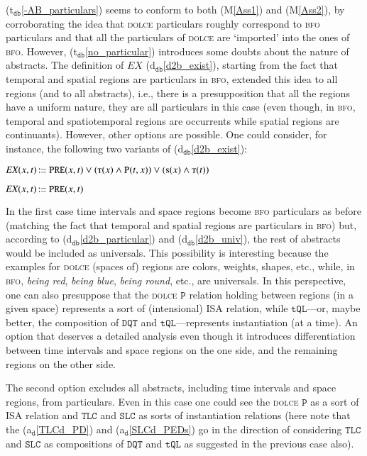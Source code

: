 \documentclass[ao]{iosart2x}
\newcommand{\nb}[1]{\textcolor{red}{$|$}\marginpar{\hspace*{-0cm}\parbox{20mm}{\scriptsize\raggedright\textcolor{red}{#1}}}}
\newcommand{\bflist}{\begin{list}{}{\setlength{\topsep}{2mm}\setlength{\parsep}{0mm}\setlength{\leftmargin}{9.2mm}\setlength{\labelwidth}{8mm}}}
\newcommand{\eflist}{\end{list}}
\newcommand{\dolceAxLabel}{\textrm{a$_\texttt{d}$}}
\newcommand{\dbDefLabel}{\textrm{d$_\texttt{db}$}}
\newcommand{\dbThrLabel}{\textrm{t$_\texttt{db}$}}
\newcommand{\refdolceax}[1]{({\dolceAxLabel}\ref{#1})}
\newcommand{\refdbdf}[1]{({\dbDefLabel}\ref{#1})}
\newcommand{\refdbth}[1]{({\dbThrLabel}\ref{#1})}
\newcommand{\pr}[1]{\mathtt{#1}}
\newcommand{\prbfo}[1]{{\textit{{#1}}}}
\newcommand\textequal{%
 \rule[.08ex]{5pt}{0.35pt}\llap{\rule[.78ex]{5pt}{0.35pt}}}
\newcommand{\sdef}{{\hspace{1.5pt}:\hspace{-2.5pt}\textequal\hspace{3pt}}}
\newcommand{\dolce}{{\textsc{dolce}}}
\newcommand{\bfo}{{\textsc{bfo}}}
\newcommand {\Sdcat} {\textsc{s}}
\newcommand {\Tdcat} {\textsc{t}}
\newcommand {\Pd} {\ensuremath{\pr{P}}}
\newcommand {\PREd} {\ensuremath{\pr{PRE}}}
\newcommand {\DQTd} {\ensuremath{\pr{DQT}}}
\newcommand {\TQLd} {\ensuremath{\pr{tQL}}}
\newcommand {\SLCd} {\ensuremath{\pr{SLC}}}
\newcommand {\TLCd} {\ensuremath{\pr{TLC}}}
\newcommand{\bfoexist}{\prbfo{EX}}
\begin{document}
\refdbth{-AB_particulars} seems to conform to both (M\ref{Ass1}) and (M\ref{Ass2}), by corroborating the idea that {\dolce} particulars roughly correspond to {\bfo} particulars and that all the particulars of {\dolce} are `imported' into the ones of {\bfo}. However, \refdbth{no_particular} introduces some doubts about the nature of abstracts. The definition of $\bfoexist$ \refdbdf{d2b_exist}, starting from the fact that temporal and spatial regions are particulars in {\bfo}, extended this idea to all regions (and to all abstracts), i.e., there is a presupposition that all the regions have a uniform nature, they are all particulars in this case (even though, in {\bfo}, temporal and spatiotemporal regions are occurrents while spatial regions are continuants). However, other options are possible. One could consider, for instance, the following two variants of \refdbdf{d2b_exist}:
\bflist
\item[] $\bfoexist(x,t)\sdef \PREd(x,t) \lor (\Tdcat(x) \land \Pd(t,x)) \lor (\Sdcat(x) \land \Tdcat(t))$
\item[] $\bfoexist(x,t)\sdef \PREd(x,t)$
\eflist
%
In the first case time intervals and space regions become {\bfo} particulars as before (matching the fact that temporal and spatial regions are particulars in {\bfo}) but, according to \refdbdf{d2b_particular} and \refdbdf{d2b_univ}, the rest of abstracts would be included as universals. This possibility is interesting because the examples for {\dolce} (spaces of) regions are colors, weights, shapes, etc., while, in {\bfo}, \emph{being red}, \emph{being blue}, \emph{being round}, etc., are universals. In this perspective, one can also presuppose that the {\dolce} $\Pd$ relation holding between regions (in a given space) represents a sort of (intensional) ISA relation, while $\TQLd$---or, maybe better, the composition of $\DQTd$ and  $\TQLd$---represents instantiation (at a time). An option that deserves a detailed analysis even though it introduces differentiation between time intervals and space regions on the one side, and the remaining regions on the other side.%

The second option excludes all abstracts, including time intervals and space regions, from particulars. Even in this case one could see the {\dolce} $\Pd$ as a sort of ISA relation and $\TLCd$ and $\SLCd$ as sorts of instantiation relations (here note that the \refdolceax{TLCd_PD} and  \refdolceax{SLCd_PEDs} go in the direction of considering $\TLCd$ and $\SLCd$ as compositions of $\DQTd$ and  $\TQLd$ as suggested in the previous case also).
\end{document}
